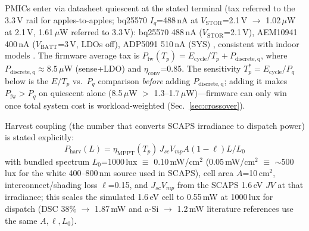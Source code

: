 \documentclass[10pt, conference, letterpaper]{IEEEtran}
\begin{document}
PMICs enter via datasheet quiescent at the stated terminal (tax referred to the 3.3\,V rail for apples-to-apples; bq25570 $I_q$=488\,nA at $V_{\mathrm{STOR}}$=2.1\,V $\rightarrow$ 1.02\,$\mu$W at 2.1\,V, 1.61\,$\mu$W referred to 3.3\,V): bq25570 488\,nA ($V_{\mathrm{STOR}}$=2.1\,V), AEM10941 400\,nA ($V_{\mathrm{BATT}}$=3\,V, LDOs off), ADP5091 510\,nA (SYS) \cite{ti_bq25570,ep_aem10941,adi_adp5091}, consistent with indoor models \cite{brunner2024harvestics}. The firmware average tax is $P_{\mathrm{fw}}(T_p)=E_{\mathrm{cycle}}/T_p + P_{\mathrm{discrete,q}}$, where $P_{\mathrm{discrete,q}}\approx8.5\,\mu$W (sense+LDO) and $\eta_{\mathrm{conv}}$=0.85. The sensitivity $T_p^*=E_{\mathrm{cycle}}/P_q$ below is the $E/T_p$ vs.\ $P_q$ comparison \emph{before} adding $P_{\mathrm{discrete,q}}$; adding it makes $P_{\mathrm{fw}}>P_q$ on quiescent alone (8.5\,$\mu$W $>$ 1.3--1.7\,$\mu$W)---firmware can only win once total system cost is workload-weighted (Sec.~\ref{sec:crossover}).

Harvest coupling (the number that converts SCAPS irradiance to dispatch power) is stated explicitly:
\begin{equation}
P_{\mathrm{harv}}(L)=\eta_{\mathrm{MPPT}}(T_p)\,J_{sc}V_{mp}A(1-\ell)L/L_0
\label{eq:lux2harv}
\end{equation}
with bundled spectrum $L_0$=1000\,lux $\equiv$ 0.10\,mW/cm$^2$ (0.05\,mW/cm$^2$ $\equiv$ $\sim$500\,lux for the white 400--800\,nm source used in SCAPS), cell area $A$=10\,cm$^2$, interconnect/shading loss $\ell$=0.15, and $J_{sc}V_{mp}$ from the SCAPS 1.6\,eV $JV$ at that irradiance; this scales the simulated 1.6\,eV cell to 0.55\,mW at 1000\,lux for dispatch (DSC 38\% $\rightarrow$ 1.87\,mW and a-Si $\rightarrow$ 1.2\,mW literature references use the same $A,\ell,L_0$).
\end{document}
